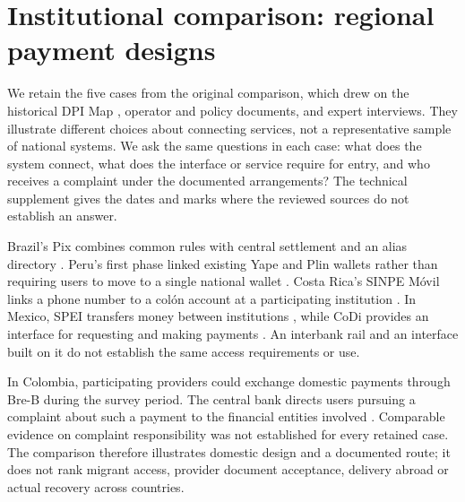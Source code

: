 \section{Institutional comparison: regional payment designs}
\label{sec:benchmark}
We retain the five cases from the original comparison, which drew on the historical DPI Map \citep{institute_for_innovation_and_public_purpose_ucl_dpi_2025}, operator and policy documents, and expert interviews. They illustrate different choices about connecting services, not a representative sample of national systems. We ask the same questions in each case: what does the system connect, what does the interface or service require for entry, and who receives a complaint under the documented arrangements? The technical supplement gives the dates and marks where the reviewed sources do not establish an answer.

Brazil's Pix combines common rules with central settlement and an alias directory \citep{bcbpix}. Peru's first phase linked existing Yape and Plin wallets rather than requiring users to move to a single national wallet \citep{bcrp2025}. Costa Rica's SINPE Móvil links a phone number to a colón account at a participating institution \citep{bccrsinpe}. In Mexico, SPEI transfers money between institutions \citep{banxicospei}, while CoDi provides an interface for requesting and making payments \citep{banxicocodi}. An interbank rail and an interface built on it do not establish the same access requirements or use.

In Colombia, participating providers could exchange domestic payments through Bre-B during the survey period. The central bank directs users pursuing a complaint about such a payment to the financial entities involved \citep{banreptechnical2026,banrepfaq}. Comparable evidence on complaint responsibility was not established for every retained case. The comparison therefore illustrates domestic design and a documented route; it does not rank migrant access, provider document acceptance, delivery abroad or actual recovery across countries.
